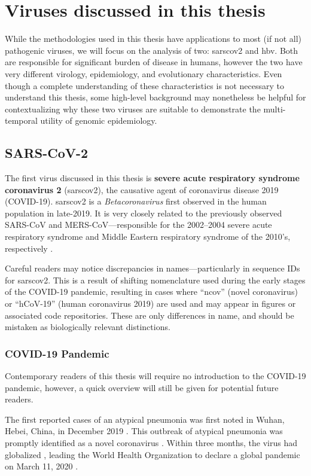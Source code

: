 \section{Viruses discussed in this thesis}
While the methodologies used in this thesis have applications to most (if not all) pathogenic viruses, we will focus on the analysis of two: \gls{sarscov2} and \gls{hbv}.
Both are responsible for significant burden of disease in humans, however the two have very different virology, epidemiology, and evolutionary characteristics.
Even though a complete understanding of these characteristics is not necessary to understand this thesis, some high-level background may nonetheless be helpful for contextualizing why these two viruses are suitable to demonstrate the multi-temporal utility of genomic epidemiology.

\subsection{SARS-CoV-2}
The first virus discussed in this thesis is \textbf{severe acute respiratory syndrome coronavirus 2} (\gls{sarscov2}), the causative agent of coronavirus disease 2019 (COVID-19).
\gls{sarscov2} is a \textit{Betacoronavirus} first observed in the human population in late-2019.
It is very closely related to the previously observed SARS-CoV and MERS-CoV---responsible for the 2002--2004 severe acute respiratory syndrome and Middle Eastern respiratory syndrome of the 2010's, respectively \cite{gorbalenya2020species}.
    
Careful readers may notice discrepancies in names---particularly in sequence IDs for \gls{sarscov2}.
This is a result of shifting nomenclature used during the early stages of the COVID-19 pandemic, resulting in cases where ``ncov'' (novel coronavirus) or ``hCoV-19'' (human coronavirus 2019) are used and may appear in figures or associated code repositories.
These are only differences in name, and should be mistaken as biologically relevant distinctions.

\subsubsection{COVID-19 Pandemic}
Contemporary readers of this thesis will require no introduction to the COVID-19 pandemic, however, a quick overview will still be given for potential future readers.

The first reported cases of an atypical pneumonia was first noted in Wuhan, Hebei, China, in December 2019 \citep{zhou2020pneumonia}.
This outbreak of atypical pneumonia was promptly identified as a novel coronavirus \citep{wu2020new}.
Within three months, the virus had globalized \cite{dong2020interactive}, leading the World Health Organization to declare a global pandemic on March 11, 2020 \cite{healthorganization2020coronavirus}.

